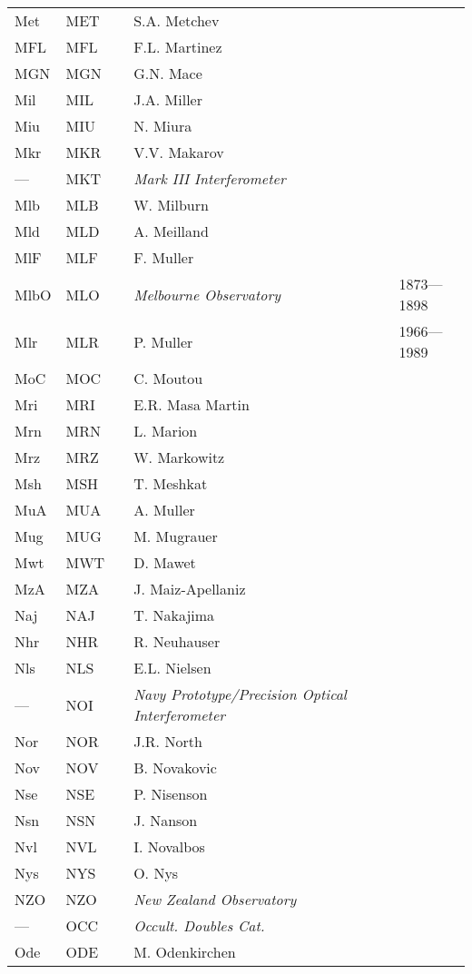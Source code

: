 \begin{longtable}{l|l|c|p{59mm}|l}
Met & MET &   & S.A. Metchev & \\
MFL & MFL &   & F.L. Martinez & \\
MGN & MGN &   & G.N. Mace & \\
Mil & MIL &   & J.A. Miller & \\
Miu & MIU &   & N. Miura & \\
Mkr & MKR &   & V.V. Makarov & \\
--- & MKT &   & \emph{Mark III Interferometer} & \\
Mlb & MLB &   & W. Milburn & \\
Mld & MLD &   & A. Meilland & \\
MlF & MLF &   & F. Muller & \\
MlbO & MLO &   & \emph{Melbourne Observatory} & 1873---1898 \\
Mlr & MLR &   & P. Muller & 1966---1989 \\
MoC & MOC &   & C. Moutou & \\
Mri & MRI &   & E.R. Masa Martin & \\
Mrn & MRN &   & L. Marion & \\
Mrz & MRZ &   & W. Markowitz & \\
Msh & MSH &   & T. Meshkat & \\
MuA & MUA &   & A. Muller & \\
Mug & MUG &   & M. Mugrauer & \\
Mwt & MWT &   & D. Mawet & \\
MzA & MZA &   & J. Maiz-Apellaniz & \\\midrule
Naj & NAJ &   & T. Nakajima & \\
Nhr & NHR &   & R. Neuhauser & \\
Nls & NLS &   & E.L. Nielsen & \\
--- & NOI &   & \emph{Navy Prototype/Precision Optical Interferometer} & \\
Nor & NOR &   & J.R. North & \\
Nov & NOV &   & B. Novakovic & \\
Nse & NSE &   & P. Nisenson & \\
Nsn & NSN &   & J. Nanson & \\
Nvl & NVL &   & I. Novalbos & \\
Nys & NYS &   & O. Nys & \\
NZO & NZO &   & \emph{New Zealand Observatory} & \\\midrule
--- & OCC &   & \emph{Occult. Doubles Cat.} & \\
Ode & ODE &   & M. Odenkirchen & \\

\end{longtable}
